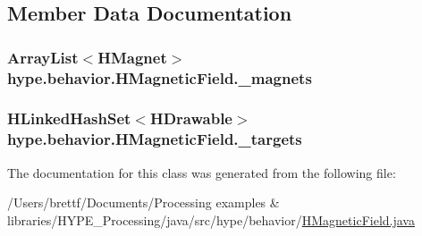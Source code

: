 \subsection{Member Data Documentation}
\hypertarget{classhype_1_1behavior_1_1_h_magnetic_field_a571dc191ead43a576513fb710a184bb4}{
\subsubsection[{\-\_\-magnets}]{\setlength{\rightskip}{0pt plus 5cm}Array\-List$<$H\-Magnet$>$ hype.\-behavior.\-H\-Magnetic\-Field.\-\_\-magnets\hspace{0.3cm}{\ttfamily [protected]}}}\label{classhype_1_1behavior_1_1_h_magnetic_field_a571dc191ead43a576513fb710a184bb4}
\hypertarget{classhype_1_1behavior_1_1_h_magnetic_field_a2d6fe89f3ad7910e52f5af6f3d2b8c26}{
\subsubsection[{\-\_\-targets}]{\setlength{\rightskip}{0pt plus 5cm}H\-Linked\-Hash\-Set$<${\bf H\-Drawable}$>$ hype.\-behavior.\-H\-Magnetic\-Field.\-\_\-targets\hspace{0.3cm}{\ttfamily [protected]}}}\label{classhype_1_1behavior_1_1_h_magnetic_field_a2d6fe89f3ad7910e52f5af6f3d2b8c26}


The documentation for this class was generated from the following file\-:\begin{DoxyCompactItemize}
\item 
/\-Users/brettf/\-Documents/\-Processing examples \& libraries/\-H\-Y\-P\-E\-\_\-\-Processing/java/src/hype/behavior/\hyperlink{_h_magnetic_field_8java}{H\-Magnetic\-Field.\-java}\end{DoxyCompactItemize}
